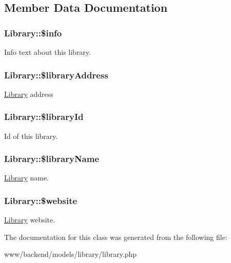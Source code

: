 \subsection{Member Data Documentation}
\hypertarget{classLibrary_afd004ebf7293b3b1b3be5afccb5eb396}{
\subsubsection[{\$info}]{\setlength{\rightskip}{0pt plus 5cm}Library::\$info}}
\label{classLibrary_afd004ebf7293b3b1b3be5afccb5eb396}
Info text about this library. \hypertarget{classLibrary_ae0971e71837cc3270e95ad59910b8570}{
\subsubsection[{\$libraryAddress}]{\setlength{\rightskip}{0pt plus 5cm}Library::\$libraryAddress}}
\label{classLibrary_ae0971e71837cc3270e95ad59910b8570}
\hyperlink{classLibrary}{Library} address \hypertarget{classLibrary_a54b997a065042081ebc9b3b636a37191}{
\subsubsection[{\$libraryId}]{\setlength{\rightskip}{0pt plus 5cm}Library::\$libraryId}}
\label{classLibrary_a54b997a065042081ebc9b3b636a37191}
Id of this library. \hypertarget{classLibrary_a9b8bf43c7a46c1cee209579a530ea25b}{
\subsubsection[{\$libraryName}]{\setlength{\rightskip}{0pt plus 5cm}Library::\$libraryName}}
\label{classLibrary_a9b8bf43c7a46c1cee209579a530ea25b}
\hyperlink{classLibrary}{Library} name. \hypertarget{classLibrary_ac1629c45731a1f498dbf69908d80f390}{
\subsubsection[{\$website}]{\setlength{\rightskip}{0pt plus 5cm}Library::\$website}}
\label{classLibrary_ac1629c45731a1f498dbf69908d80f390}
\hyperlink{classLibrary}{Library} website. 

The documentation for this class was generated from the following file:\begin{DoxyCompactItemize}
\item 
www/backend/models/library/library.php\end{DoxyCompactItemize}
